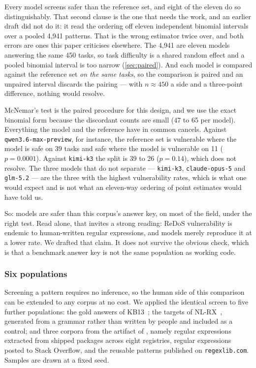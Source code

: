 \documentclass[11pt]{article}
\begin{document}
Every model screens safer than the reference set, and eight of the eleven do
so distinguishably. That second clause is the one that needs the work, and an
earlier draft did not do it: it read the ordering off eleven independent
binomial intervals over a pooled 4{,}941 patterns. That is the wrong estimator
twice over, and both errors are ones this paper criticises elsewhere. The
4{,}941 are eleven models answering the same 450 tasks, so task difficulty is
a shared random effect and a pooled binomial interval is too narrow
(\cref{sec:paired}). And each model is compared against the reference set
\emph{on the same tasks}, so the comparison is paired and an unpaired interval
discards the pairing --- with $n \approx 450$ a side and a three-point
difference, nothing would resolve.

McNemar's test is the paired procedure for this design, and we use the exact
binomial form because the discordant counts are small (47 to 65 per model).
Everything the model and the reference have in common cancels. Against
\texttt{qwen3.6-max-preview}, for instance, the reference set is vulnerable
where the model is safe on 39 tasks and safe where the model is vulnerable on
11 ($p = 0.0001$). Against \texttt{kimi-k3} the split is 39 to 26
($p = 0.14$), which does not resolve. The three models that do not separate
--- \texttt{kimi-k3}, \texttt{claude-opus-5} and \texttt{glm-5.2} --- are the
three with the highest vulnerability rates, which is what one would expect and
is not what an eleven-way ordering of point estimates would have told us.

So: models are safer than this corpus's answer key, on most of the field,
under the right test. Read alone, that invites a strong reading: ReDoS
vulnerability is endemic to human-written regular expressions, and models
merely reproduce it at a lower rate. We drafted that claim. It does not
survive the obvious check, which is that a benchmark answer key is not the
same population as working code.

\subsubsection{Six populations}
\label{sec:crosscorpus}

Screening a pattern requires no inference, so the human side of this
comparison can be extended to any corpus at no cost. We applied the identical
screen to five further populations: the gold answers of
KB13~\citep{kushman2013semantic}; the targets of
NL-RX~\citep{locascio2016neural}, generated from a grammar rather than
written by people and included as a control; and three corpora from the
artifact of \citet{davis2019linguafranca}, namely regular expressions
extracted from shipped packages across eight registries, regular expressions
posted to Stack Overflow, and the reusable patterns published on
\texttt{regexlib.com}. Samples are drawn at a fixed seed.
\end{document}
